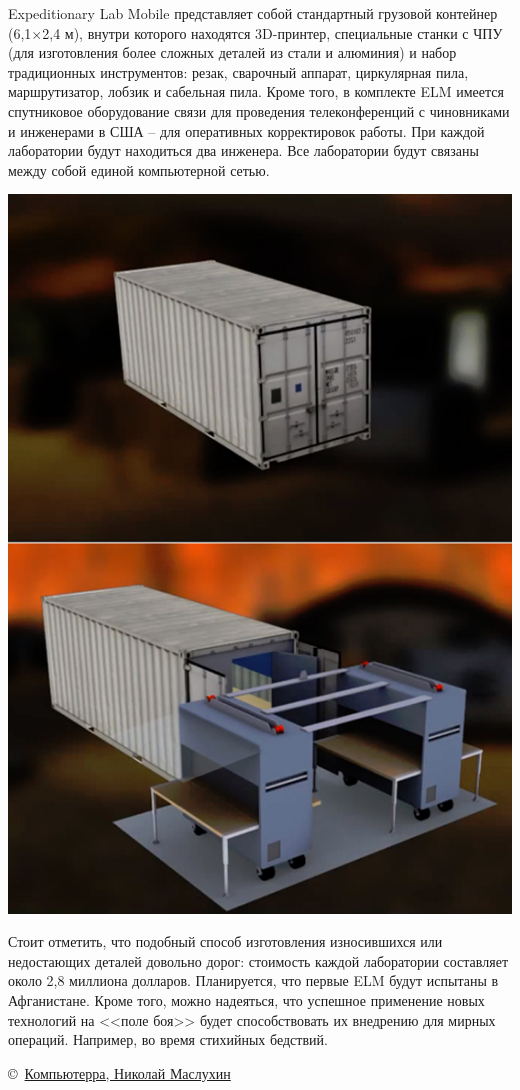 \documentclass{magazine}
\begin{document}
\begin{multicols}{2}
Expeditionary Lab Mobile представляет собой стандартный грузовой контейнер
(6,1$\times$2,4 м), внутри которого находятся 3D-принтер, специальные станки с
ЧПУ (для изготовления более сложных деталей из стали и алюминия) и набор
традиционных инструментов: резак, сварочный аппарат, циркулярная пила,
маршрутизатор, лобзик и сабельная пила. Кроме того, в комплекте ELM имеется
спутниковое оборудование связи для проведения телеконференций с чиновниками и
инженерами в США – для оперативных корректировок работы. При каждой лаборатории
будут находиться два инженера. Все лаборатории будут связаны между собой единой
компьютерной сетью.

\noindent\includegraphics[width=\columnwidth]{fig/00/02.jpg}

Стоит отметить, что подобный способ изготовления износившихся или недостающих
деталей довольно дорог: стоимость каждой лаборатории составляет около 2,8
миллиона долларов. Планируется, что первые ELM будут испытаны в Афганистане.
Кроме того, можно надеяться, что успешное применение новых технологий на <<поле
боя>> будет способствовать их внедрению для мирных операций. Например, во время
стихийных бедствий.

\bigskip
\copyright\
\href{http://www.computerra.ru/50860/polevyie-3d-printeryi-na-sluzhbe-amerikans/}{Компьютерра, Николай Маслухин}

\end{multicols}
\end{document}
